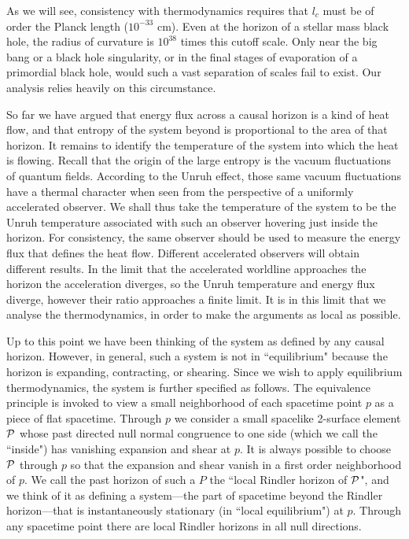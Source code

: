 \documentclass[12pt]{article}
\begin{document}
As we will see, consistency with thermodynamics requires that
$l_c$ must be of order the Planck length ($10^{-33}$ cm). Even
at the horizon of a stellar mass black hole, the radius of curvature
is $10^{38}$ times this cutoff scale. Only near the big bang or
a black hole singularity, or in the final stages of evaporation
of a primordial black hole, would such a vast separation of scales
fail to exist. Our analysis relies heavily on this circumstance.

So far we have argued that energy flux across a causal horizon
is a kind of heat flow, and that entropy of the system beyond
is proportional to the area of that horizon.
It remains to identify the temperature of the system
into which the heat is flowing. Recall that the origin of
the large entropy is the vacuum fluctuations of quantum fields. According
to the Unruh effect\cite{unruh},
those same vacuum fluctuations have a thermal
character when seen from the perspective of a uniformly accelerated
observer. We shall thus take the temperature of the system to be the
Unruh temperature associated with such an observer
hovering just inside the horizon. For consistency, the same
observer should be used to measure the energy flux that defines the
heat flow. Different accelerated observers will obtain
different results. In the limit that the accelerated worldline approaches
the horizon the acceleration diverges, so the Unruh temperature
and energy flux diverge, however their ratio approaches a finite limit.
It is in this limit that we analyse the thermodynamics, in order to
make the arguments as local as possible.

Up to this point we have been thinking of the system as
defined by any causal horizon. However, in general, such
a system is not in ``equilibrium" because the horizon
is expanding, contracting, or shearing. Since we wish to
apply equilibrium thermodynamics, the system is further
specified as follows. The equivalence principle is invoked to
view a small neighborhood of each spacetime point $p$
as a piece of flat spacetime. Through $p$ we consider a small
spacelike 2-surface element ${\cal P}$ whose past directed
null normal congruence to one side (which we call the ``inside")
has vanishing expansion and shear at $p$.  It is always
possible to choose ${\cal P}$ through $p$ so that the expansion and
shear vanish in a first order neighborhood of $p$. We call
the past horizon of such a $P$ the ``local Rindler horizon of
${\cal P}$", and we think of it as defining a system---the part of
spacetime beyond the Rindler horizon---that is instantaneously
stationary (in ``local equilibrium") at $p$.
Through any spacetime point there are local Rindler horizons in
all null directions.
\end{document}
